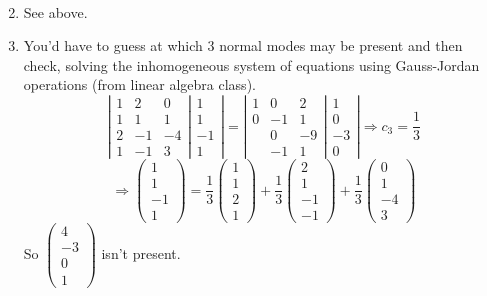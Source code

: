 \documentclass[twoside,10pt]{amsart}
\begin{document}
\begin{enumerate}
\[\begin{aligned}
\end{aligned}
\]
\item See above.
\item You'd have to guess at which 3 normal modes may be present and then check, solving the inhomogeneous system of equations using Gauss-Jordan operations (from linear algebra class).  
\[
\left| \begin{matrix} 1 & 2 & 0 \\ 1 & 1 & 1 \\ 2 & -1 & -4 \\ 1 & -1 & 3 \end{matrix} \right. \left| \begin{matrix} 1 \\ 1 \\ -1 \\ 1 \end{matrix} \right| = \left| \begin{matrix} 1 & 0 & 2 \\ 0 & -1 & 1 \\ & 0 & -9 \\ & -1 & 1 \end{matrix} \right. \left| \begin{matrix} 1 \\ 0 \\ -3 \\ 0 \end{matrix} \right| \Longrightarrow c_3 = \frac{1}{3}
\]
\[
\Longrightarrow \left( \begin{matrix} 1 \\ 1 \\ -1 \\ 1 \end{matrix} \right) = \frac{1}{3} \left( \begin{matrix} 1 \\ 1 \\ 2 \\ 1 \end{matrix} \right) + \frac{1}{3} \left( \begin{matrix} 2 \\ 1 \\ -1 \\ -1 \end{matrix} \right) + \frac{1}{3} \left( \begin{matrix} 0 \\ 1 \\ -4 \\ 3 \end{matrix} \right)
\]
So $\left( \begin{matrix} 4 \\ -3 \\ 0 \\ 1 \end{matrix} \right)$ isn't present.  
\end{enumerate}
\end{document}
